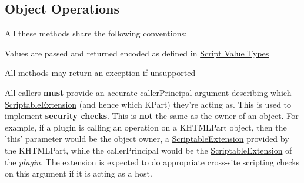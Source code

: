 \subsection*{Object Operations}
\label{_amgrp60cb1b923af3b22f2c0b4823d5c6a3c1}%
 All these methods share the following conventions\+: \begin{DoxyItemize}
\item Values are passed and returned encoded as defined in \hyperlink{group__ScriptValueTypes}{Script Value Types} \item All methods may return an exception if unsupported \item All callers {\bfseries must} provide an accurate caller\+Principal argument describing which \hyperlink{classKParts_1_1ScriptableExtension}{Scriptable\+Extension} (and hence which K\+Part) they're acting as. This is used to implement {\bfseries security checks}. This is {\bfseries not} the same as the owner of an object. For example, if a plugin is calling an operation on a K\+H\+T\+M\+L\+Part object, then the 'this' parameter would be the object owner, a \hyperlink{classKParts_1_1ScriptableExtension}{Scriptable\+Extension} provided by the K\+H\+T\+M\+L\+Part, while the caller\+Principal would be the \hyperlink{classKParts_1_1ScriptableExtension}{Scriptable\+Extension} of the {\itshape plugin}. The extension is expected to do appropriate cross-\/site scripting checks on this argument if it is acting as a host. \end{DoxyItemize}
